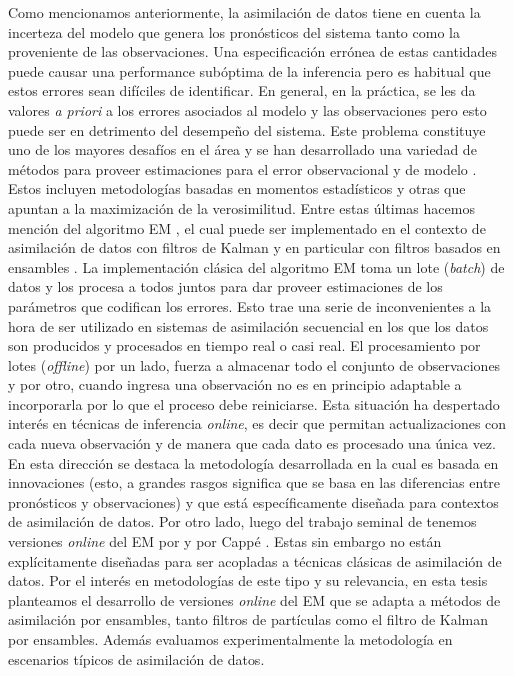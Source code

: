 Como mencionamos anteriormente, la asimilación de datos tiene en cuenta la incerteza del modelo que genera los pronósticos del sistema tanto como la proveniente de las observaciones. Una especificación errónea de estas cantidades puede causar una performance subóptima de la inferencia pero es habitual que estos errores sean difíciles de identificar. En general, en la práctica, se les da valores \textit{a priori} a los errores asociados al modelo y las observaciones pero esto puede ser en detrimento del desempeño del sistema. Este problema constituye uno de los mayores desafíos en el área y se han desarrollado una variedad de métodos para proveer estimaciones para el error observacional y de modelo \citep{Tandeo2020}. Estos incluyen metodologías basadas en momentos estadísticos y otras que apuntan a la maximización de la verosimilitud. Entre estas últimas hacemos mención del algoritmo EM \citep{Dempster1977}, el cual puede ser implementado en el contexto de asimilación de datos con filtros de Kalman y en particular con filtros basados en ensambles \citep{Tandeo2015}. La implementación clásica del algoritmo EM toma un lote (\textit{batch}) de datos y los procesa a todos juntos para dar proveer estimaciones de los parámetros que codifican los errores. Esto trae una serie de inconvenientes a la hora de ser utilizado en sistemas de asimilación secuencial en los que los datos son producidos y procesados en tiempo real o casi real. El procesamiento por lotes (\textit{offline}) por un lado, fuerza a almacenar todo el conjunto de observaciones y por otro, cuando ingresa una observación no es en principio adaptable a incorporarla por lo que el proceso debe reiniciarse. Esta situación ha despertado interés en técnicas de inferencia \textit{online}, es decir que permitan actualizaciones con cada nueva observación y de manera que cada dato es procesado una única vez. En esta dirección se destaca la metodología desarrollada en \cite{Berry2013} la cual es basada en innovaciones (esto, a grandes rasgos significa que se basa en las diferencias entre pronósticos y observaciones) y que está específicamente diseñada para contextos de asimilación de datos. Por otro lado, luego del trabajo seminal de \cite{Neal1998} tenemos versiones \textit{online} del EM por \cite{Andrieu2003} y por Cappé \citep{Cappe2009,Cappe2011}. Estas sin embargo no están explícitamente diseñadas para ser acopladas a técnicas clásicas de asimilación de datos. Por el interés en metodologías de este tipo y su relevancia, en esta tesis planteamos el desarrollo de versiones \textit{online} del EM que se adapta a métodos de asimilación por ensambles, tanto filtros de partículas como el filtro de Kalman por ensambles. Además evaluamos experimentalmente la metodología en escenarios típicos de asimilación de datos.

